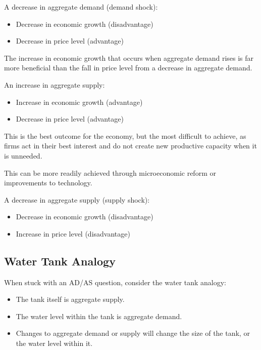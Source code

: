 \documentclass[a4paper,11pt]{article}
\begin{document}
A decrease in aggregate demand (demand shock):

\begin{itemize}
\item Decrease in economic growth (disadvantage)
\item Decrease in price level (advantage)
\end{itemize}

The increase in economic growth that occurs when aggregate demand rises is far
more beneficial than the fall in price level from a decrease in aggregate
demand.

An increase in aggregate supply:

\begin{itemize}
\item Increase in economic growth (advantage)
\item Decrease in price level (advantage)
\end{itemize}

This is the best outcome for the economy, but the most difficult to achieve, as
firms act in their best interest and do not create new productive capacity when
it is unneeded.

This can be more readily achieved through microeconomic reform or improvements
to technology.

A decrease in aggregate supply (supply shock):

\begin{itemize}
\item Decrease in economic growth (disadvantage)
\item Increase in price level (disadvantage)
\end{itemize}


\subsection{Water Tank Analogy}

When stuck with an AD/AS question, consider the water tank analogy:

\begin{itemize}
\item The tank itself is aggregate supply.
\item The water level within the tank is aggregate demand.
\item Changes to aggregate demand or supply will change the size of the tank, or
	the water level within it.
\end{itemize}
\end{document}
